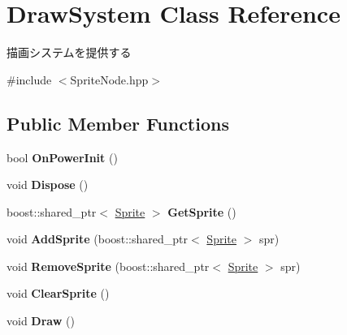 \hypertarget{class_draw_system}{}\section{Draw\+System Class Reference}
\label{class_draw_system}


描画システムを提供する  




{\ttfamily \#include $<$Sprite\+Node.\+hpp$>$}

\subsection*{Public Member Functions}
\begin{DoxyCompactItemize}
\item 
bool {\bfseries On\+Power\+Init} ()\hypertarget{class_draw_system_a4fcc569cfd3066844254eb1c06e72f20}{}\label{class_draw_system_a4fcc569cfd3066844254eb1c06e72f20}

\item 
void {\bfseries Dispose} ()\hypertarget{class_draw_system_a3ac28af10a2f61a4fa54e4230f3afb8e}{}\label{class_draw_system_a3ac28af10a2f61a4fa54e4230f3afb8e}

\item 
boost\+::shared\+\_\+ptr$<$ \hyperlink{class_sprite}{Sprite} $>$ {\bfseries Get\+Sprite} ()\hypertarget{class_draw_system_a81593792372d8793a9204547e3eb5582}{}\label{class_draw_system_a81593792372d8793a9204547e3eb5582}

\item 
void {\bfseries Add\+Sprite} (boost\+::shared\+\_\+ptr$<$ \hyperlink{class_sprite}{Sprite} $>$ spr)\hypertarget{class_draw_system_aec142a500ca3cfa0f58c57ec4f40cf3a}{}\label{class_draw_system_aec142a500ca3cfa0f58c57ec4f40cf3a}

\item 
void {\bfseries Remove\+Sprite} (boost\+::shared\+\_\+ptr$<$ \hyperlink{class_sprite}{Sprite} $>$ spr)\hypertarget{class_draw_system_a558dcef6044d9d747056af003d889870}{}\label{class_draw_system_a558dcef6044d9d747056af003d889870}

\item 
void {\bfseries Clear\+Sprite} ()\hypertarget{class_draw_system_a9332ac89fa32d17bf7dfd09bbfa573ae}{}\label{class_draw_system_a9332ac89fa32d17bf7dfd09bbfa573ae}

\item 
void {\bfseries Draw} ()\hypertarget{class_draw_system_a39cef1b6e860faeddd1b88748fec0e0f}{}\label{class_draw_system_a39cef1b6e860faeddd1b88748fec0e0f}

\end{DoxyCompactItemize}
